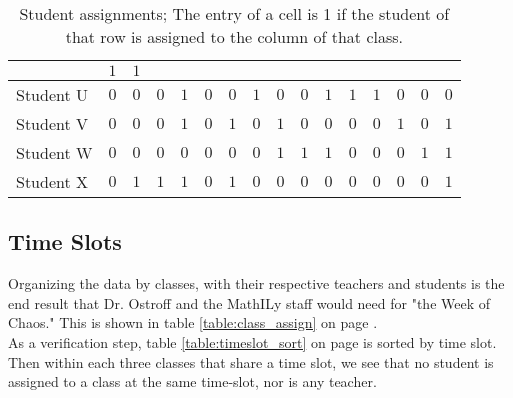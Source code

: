 \documentclass[11pt]{article}
\begin{document}
\begin{table}[h]
\begin{tabular}{|a||l|l|l|l|l|l|l|l|l|l|l|l|l|l|l|}
& $1$ & $1$ \\ \hline
Student U & $0$ & $0$ & $0$ & $1$ & $0$ & $0$
& $1$ & $0$ & $0$ & $1$ & $1$ & $1$ & $0$
& $0$ & $0$ \\ \hline
Student V & $0$ & $0$ & $0$ & $1$ & $0$ & $1$
& $0$ & $1$ & $0$ & $0$ & $0$ & $0$ & $1$
& $0$ & $1$ \\ \hline
Student W & $0$ & $0$ & $0$ & $0$ & $0$ & $0$
& $0$ & $1$ & $1$ & $1$ & $0$ & $0$ & $0$
& $1$ & $1$ \\ \hline
Student X & $0$ & $1$ & $1$ & $1$ & $0$ & $1$
& $0$ & $0$ & $0$ & $0$ & $0$ & $0$ & $0$
& $0$ & $1$ \\ \hline
\end{tabular}
\caption{Student assignments; The entry of a cell is 1 if the student of that row is assigned to the column of that class.}
\label{table:stud_assign}
\end{table}



\FloatBarrier	
\subsection{Time Slots}
Organizing the data by classes, with their respective teachers and students is the end result that Dr. Ostroff and the MathILy staff would need for "the Week of Chaos." This is shown in table \ref{table:class_assign} on page \pageref{table:class_assign}.\\
\indent As a verification step, table \ref{table:timeslot_sort} on page \pageref{table:timeslot_sort} is sorted by time slot. Then within each three classes that share a time slot, we see that no student is assigned to a class at the same time-slot, nor is any teacher.
\end{document}
